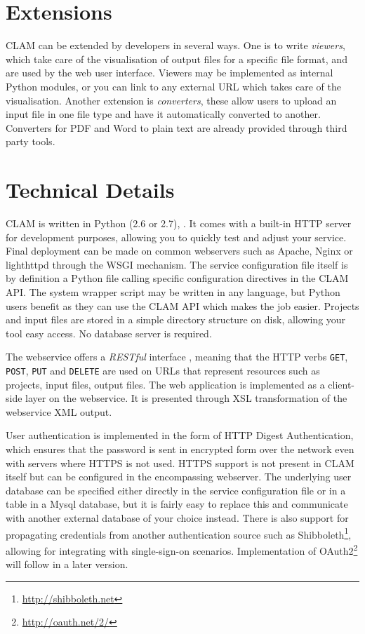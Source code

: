 \documentclass[11pt]{article}
\begin{document}
\section{Extensions}

CLAM can be extended by developers in several ways. One is to write
\emph{viewers}, which take care of the visualisation of output files for a
specific file format, and are used by the web user interface. Viewers may be
implemented as internal Python modules, or you can link to any external URL
which takes care of the visualisation. Another extension is
\emph{converters}, these allow users to upload an input file in one file type and have it
automatically converted to another. Converters for PDF and Word to plain text are already
provided through third party tools.

\section{Technical Details}

CLAM is written in Python (2.6 or 2.7), \cite{PYTHON}. It comes with a built-in HTTP server for
development purposes, allowing you to quickly test and adjust your service.
Final deployment can be made on common webservers such as Apache, Nginx or lighthttpd
through the WSGI mechanism. The service configuration file itself is by
definition a Python file calling specific configuration directives in the CLAM
API. The system wrapper script may be written in any language, but Python users
benefit as they can use the CLAM API which makes the job easier. Projects and
input files are stored in a simple directory structure on disk, allowing your
tool easy access. No database server is required.

The webservice offers a \emph{RESTful} interface \cite{REST}, meaning that the HTTP
verbs \texttt{GET}, \texttt{POST}, \texttt{PUT} and \texttt{DELETE} are used on
URLs that represent resources such as projects, input files, output files. The
web application is implemented as a client-side layer on the webservice. It is
presented through XSL transformation \cite{XSLT} of the webservice XML output.

User authentication is implemented in the form of HTTP Digest Authentication,
which ensures that the password is sent in encrypted form over the network even
with servers where HTTPS is not used. HTTPS support is not present in CLAM
itself but can be configured in the encompassing webserver. The underlying user
database can be specified either directly in the service configuration file or
in a table in a Mysql database, but it is fairly easy to replace this and
communicate with another external database of your choice instead. There is
also support for propagating credentials from another authentication source
such as Shibboleth\footnote{\url{http://shibboleth.net}}, allowing for integrating with single-sign-on scenarios.
Implementation of OAuth2\footnote{\url{http://oauth.net/2/}} will follow in a later version.
\end{document}
